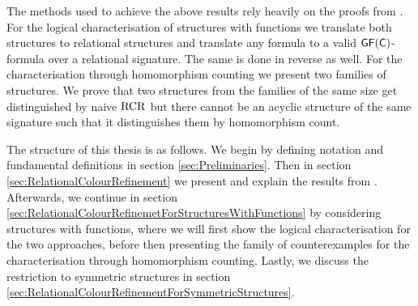 The methods used to achieve the above results rely heavily on the proofs from \cite{scheidt2025ColorRefinement}.
For the logical characterisation of structures with functions we translate both structures to relational structures and translate any formula to a valid $\mathsf{GF}(\mathsf{C})$-formula over a relational signature.
The same is done in reverse as well.
For the characterisation through homomorphism counting we present two families of structures.
We prove that two structures from the families of the same size get distinguished by naive $\operatorname{RCR}$ but there cannot be an acyclic structure of the same signature such that it distinguishes them by homomorphism count.

The structure of this thesis is as follows.
We begin by defining notation and fundamental definitions in section \ref{sec:Preliminaries}.
Then in section \ref{sec:RelationalColourRefinement} we present and explain the results from \cite{scheidt2025ColorRefinement}.
Afterwards, we continue in section \ref{sec:RelationalColourRefinemetForStructuresWithFunctions} by considering structures with functions, where we will first show the logical characterisation for the two approaches, before then presenting the family of counterexamples for the characterisation through homomorphism counting.
Lastly, we discuss the restriction to symmetric structures in section \ref{sec:RelationalColourRefinementForSymmetricStructures}.




